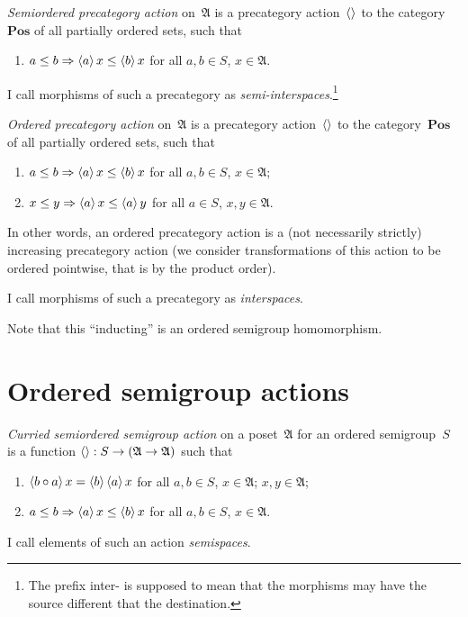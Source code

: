 \begin{defn}
\emph{Semiordered precategory action} on~$\mathfrak{A}$ is a precategory action~$\left\langle \right\rangle$ to the category~$\mathbf{Pos}$ of all partially ordered sets, such that
\begin{enumerate}
\item $a\leq b\Rightarrow\left\langle a\right\rangle x\leq \left\langle b\right\rangle x$ for all $a,b\in S$, $x\in\mathfrak{A}$.
\end{enumerate}
I call morphisms of such a precategory as \emph{semi-interspaces}.\footnote{The prefix inter- is supposed to mean that the morphisms may have the source different that the destination.}
\end{defn}

\begin{defn}
\emph{Ordered precategory action} on~$\mathfrak{A}$ is a precategory action~$\left\langle \right\rangle$ to the category~$\mathbf{Pos}$ of all partially ordered sets, such that
\begin{enumerate}
\item $a\leq b\Rightarrow\left\langle a\right\rangle x\leq \left\langle b\right\rangle x$ for all $a,b\in S$, $x\in\mathfrak{A}$;
\item $x\leq y\Rightarrow\left\langle a\right\rangle x\leq \left\langle a\right\rangle y$ for all $a\in S$, $x,y\in\mathfrak{A}$.
\end{enumerate}
In other words, an ordered precategory action is a (not necessarily strictly) increasing precategory action (we consider transformations of this action to be ordered pointwise, that is by the product order).

I call morphisms of such a precategory as \emph{interspaces}.
\end{defn}

Note that this ``inducting'' is an ordered semigroup homomorphism.

\chapter{Ordered semigroup actions}

\begin{defn}
\emph{Curried semiordered semigroup action} on a poset~$\mathfrak{A}$ for an ordered semigroup~$S$ is a function $\left\langle \right\rangle:S\to(\mathfrak{A}\to\mathfrak{A})$ such that
\begin{enumerate}
\item $\left\langle b\circ a\right\rangle x = \left\langle b\right\rangle\left\langle a\right\rangle x$ for all $a,b\in S$, $x\in\mathfrak{A}$;
$x,y\in\mathfrak{A}$;
\item $a\leq b\Rightarrow\left\langle a\right\rangle x\leq \left\langle b\right\rangle x$ for all $a,b\in S$, $x\in\mathfrak{A}$.
\end{enumerate}
I call elements of such an action \emph{semispaces}.
\end{defn}

